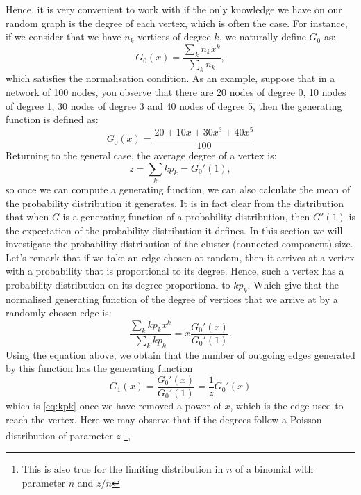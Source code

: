 Hence, it is very convenient to work with if the only knowledge we have on our random graph is the degree of each vertex, which is often the case.
For instance, if we consider that we have $n_k$ vertices of degree $k$, we naturally define $G_0$ as:
\begin{equation}
	G_0(x) = \frac{\sum_k n_k x^k}{\sum_k n_k},
\end{equation}
which satisfies the normalisation condition. 
As an example, suppose that in a network of 100 nodes, you observe that there are 20 nodes of degree 0, 10 nodes of degree 1, 30 nodes of degree 3 and 40 nodes of degree 5, then the generating function is defined as:
\begin{equation}
	G_0(x) = \frac{ 20 + 10x + 30 x^3 + 40x^5}{100}
\end{equation}
Returning to the general case, the average degree of a vertex is:
\begin{equation}
	z = \sum_k kp_k = G_0'(1),
\end{equation}
so once we can compute a generating function, we can also calculate the mean of the probability distribution it generates.
It is in fact clear from the distribution that when $G$ is a generating function of a probability distribution, then $G'(1)$ is the expectation of the probability distribution it defines.
In this section we will investigate the probability distribution of the cluster (connected component) size.
\newline
Let's remark that if we take an edge chosen at random, then it arrives at a vertex with a probability that is proportional to its degree.
Hence, such a vertex has a probability distribution on its degree proportional to $kp_k$. 
Which give that the normalised generating function of the degree of vertices that we arrive at by a randomly chosen edge is:
\begin{equation}\label{eq:kpk}
	\frac{\sum_k kp_kx^k}{\sum_k kp_k} = x\frac{G_0'(x)}{G_0'(1)}.
\end{equation}
Using the equation above, we obtain that the number of outgoing edges generated by this function has the generating function
\begin{equation}
	G_1(x) = \frac{G_0'(x)}{G_0'(1)} = \frac{1}{z}G_0'(x)
\end{equation}
which is \eqref{eq:kpk} once we have removed a power of $x$, which is the edge used to reach the vertex.
Here we may observe that if the degrees follow a Poisson distribution of parameter $z$
\footnote{This is also true for the limiting distribution in $n$ of a binomial with parameter $n$ and $z/n$},
